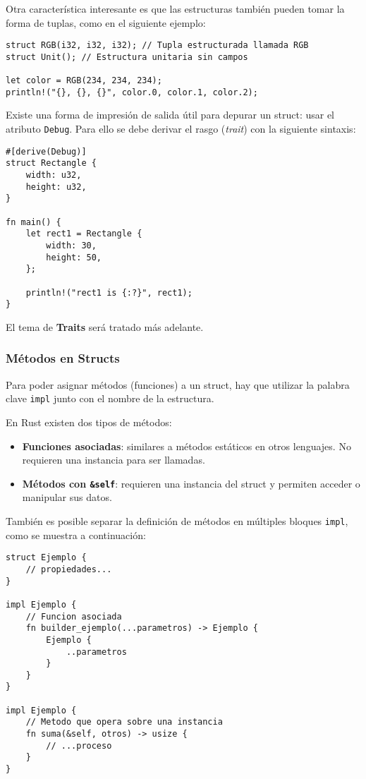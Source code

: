 \documentclass[12pt]{article}
\begin{document}
Otra característica interesante es que las estructuras también pueden tomar la forma de tuplas, como en el siguiente ejemplo:

\begin{lstlisting}[style=ruststyle]
struct RGB(i32, i32, i32); // Tupla estructurada llamada RGB
struct Unit(); // Estructura unitaria sin campos
	
let color = RGB(234, 234, 234);
println!("{}, {}, {}", color.0, color.1, color.2);
\end{lstlisting}

Existe una forma de impresión de salida útil para depurar un struct: usar el atributo \texttt{Debug}. Para ello se debe derivar el rasgo (\textit{trait}) con la siguiente sintaxis:

\begin{lstlisting}[style=ruststyle]
#[derive(Debug)]
struct Rectangle {
	width: u32,
	height: u32,
}
	
fn main() {
	let rect1 = Rectangle {
		width: 30,
		height: 50,
	};
		
	println!("rect1 is {:?}", rect1);
}
\end{lstlisting}
El tema de \textbf{Traits} será tratado más adelante.

\subsubsection{Métodos en Structs}

Para poder asignar métodos (funciones) a un struct, hay que utilizar la palabra clave \texttt{impl} junto con el nombre de la estructura.

En Rust existen dos tipos de métodos:

\begin{itemize}
	\item \textbf{Funciones asociadas}: similares a métodos estáticos en otros lenguajes. No requieren una instancia para ser llamadas.
	\item \textbf{Métodos con \texttt{\&self}}: requieren una instancia del struct y permiten acceder o manipular sus datos.
\end{itemize}

También es posible separar la definición de métodos en múltiples bloques \texttt{impl}, como se muestra a continuación:

\begin{lstlisting}[style=ruststyle]
struct Ejemplo {
	// propiedades...
}
	
impl Ejemplo {
	// Funcion asociada
	fn builder_ejemplo(...parametros) -> Ejemplo {
		Ejemplo {
			..parametros
		}
	}
}
	
impl Ejemplo {
	// Metodo que opera sobre una instancia
	fn suma(&self, otros) -> usize {
		// ...proceso
	}
}
\end{lstlisting}
\end{document}
